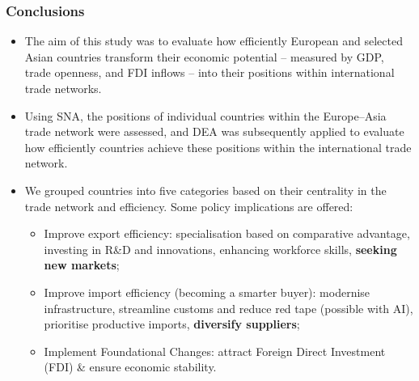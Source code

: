 \documentclass[aspectratio=169]{beamer}
\begin{document}
\begin{frame}
    \frametitle{Conclusions}

    \begin{itemize}
        \item The aim of this study was to evaluate how efficiently European and selected Asian countries transform their economic potential – measured by GDP, trade openness, and FDI inflows – into their positions within international trade networks.
        \item Using SNA, the positions of individual countries within the Europe–Asia trade network were assessed, and DEA was subsequently applied to evaluate how efficiently countries achieve these positions within the international trade network.
        \item We grouped countries into five categories based on their centrality in the trade network and efficiency. Some policy implications are offered:
        \begin{itemize}
            \item Improve export efficiency: specialisation based on comparative advantage, investing in R\&D and innovations, enhancing workforce skills, \textbf{seeking new markets};
            \item Improve import efficiency (becoming a smarter buyer): modernise infrastructure, streamline customs and reduce red tape (possible with AI), prioritise productive imports, \textbf{diversify suppliers};
            \item Implement Foundational Changes: attract Foreign Direct Investment (FDI) \& ensure economic stability.
        \end{itemize}
        
    \end{itemize}
\end{frame}
\end{document}
